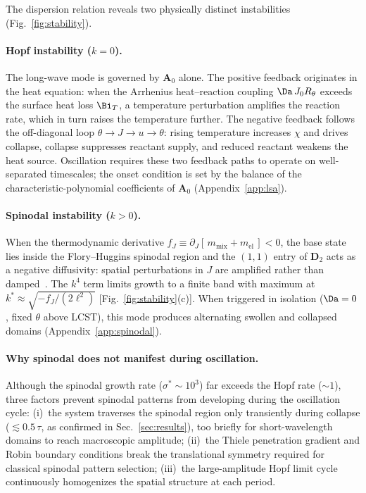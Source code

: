 The dispersion relation reveals two physically distinct instabilities
(Fig.~\ref{fig:stability}).

\paragraph{Hopf instability ($k=0$).}
The long-wave mode is governed by $\mathbf A_0$ alone.  The positive
feedback originates in the heat equation: when the Arrhenius
heat--reaction coupling $\Da\,J_0 R_\theta$ exceeds the surface heat
loss $\Bi_T$, a temperature perturbation amplifies the reaction rate,
which in turn raises the temperature further.
The negative feedback follows the off-diagonal loop
$\theta\to J\to u\to\theta$: rising temperature increases $\chi$ and
drives collapse, collapse suppresses reactant supply, and reduced
reactant weakens the heat source.  Oscillation requires these two
feedback paths to operate on well-separated timescales; the onset
condition is set by the balance of the characteristic-polynomial
coefficients of $\mathbf A_0$
(Appendix~\ref{app:lsa}).

\paragraph{Spinodal instability ($k>0$).}
When the thermodynamic derivative $f_J\equiv\partial_J[\,m_\mathrm{mix}
+m_\mathrm{el}\,]<0$, the base state lies inside the Flory--Huggins
spinodal region and the $(1,1)$ entry of $\mathbf D_2$ acts as a
negative diffusivity: spatial perturbations in $J$ are amplified
rather than damped~\cite{Onuki1993,Bai2023}.  The $k^4$ term limits
growth to a finite band with maximum at
$k^\ast\approx\sqrt{-f_J/(2\ell^2)}$
[Fig.~\ref{fig:stability}(c)].  When triggered in isolation
($\Da=0$, fixed $\theta$ above LCST), this mode produces alternating
swollen and collapsed domains (Appendix~\ref{app:spinodal}).

\paragraph{Why spinodal does not manifest during oscillation.}
Although the spinodal growth rate ($\sigma^\ast\sim 10^3$) far exceeds
the Hopf rate ($\sim\!1$), three factors prevent spinodal patterns
from developing during the oscillation cycle: (i)~the system traverses
the spinodal region only transiently during collapse
($\lesssim 0.5\,\tau$, as confirmed in Sec.~\ref{sec:results}), too briefly for short-wavelength domains to
reach macroscopic amplitude; (ii)~the Thiele penetration gradient and
Robin boundary conditions break the translational symmetry required
for classical spinodal pattern selection; (iii)~the large-amplitude
Hopf limit cycle continuously homogenizes the spatial structure at
each period.


